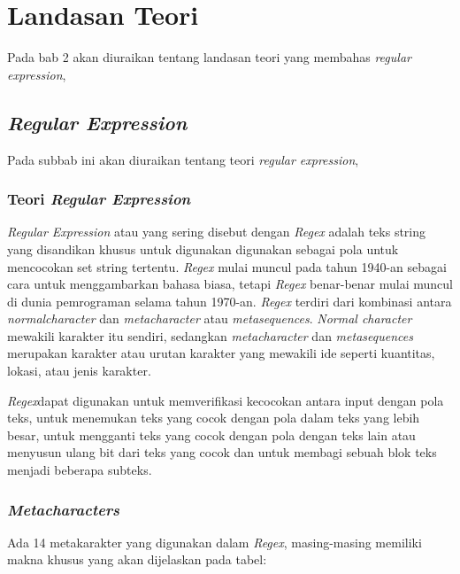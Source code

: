 \chapter{Landasan Teori}
\label{chap:teori}

Pada bab 2 akan diuraikan tentang landasan teori yang membahas \textit{regular expression},

\section{\textit{Regular Expression}}
\label{sec:regex} 
 
Pada subbab ini akan diuraikan tentang teori \textit{regular expression},

\subsection{Teori \textit{Regular Expression}}

\textit{Regular Expression} atau yang sering disebut dengan \textit{Regex} adalah teks string yang disandikan khusus untuk digunakan digunakan sebagai pola untuk mencocokan set string tertentu. \textit{Regex} mulai muncul pada tahun 1940-an sebagai cara untuk menggambarkan bahasa biasa, tetapi \textit{Regex} benar-benar mulai muncul di dunia pemrograman selama tahun 1970-an. \textit{Regex} terdiri dari kombinasi antara \textit{normalcharacter} dan \textit{metacharacter} atau \textit{metasequences}. \textit{Normal character} mewakili karakter itu sendiri, sedangkan \textit{metacharacter} dan \textit{metasequences} merupakan karakter atau urutan karakter yang mewakili ide seperti kuantitas, lokasi, atau jenis karakter.

\textit{Regex}dapat digunakan untuk memverifikasi kecocokan antara input dengan pola teks, untuk menemukan teks yang cocok dengan pola dalam teks yang lebih besar, untuk mengganti teks yang cocok dengan pola dengan teks lain atau menyusun ulang bit dari teks yang cocok dan untuk membagi sebuah blok teks menjadi beberapa subteks.

\subsection{\textit{Metacharacters}}
Ada 14 metakarakter yang digunakan dalam \textit{Regex}, masing-masing memiliki makna khusus yang akan dijelaskan pada tabel:

